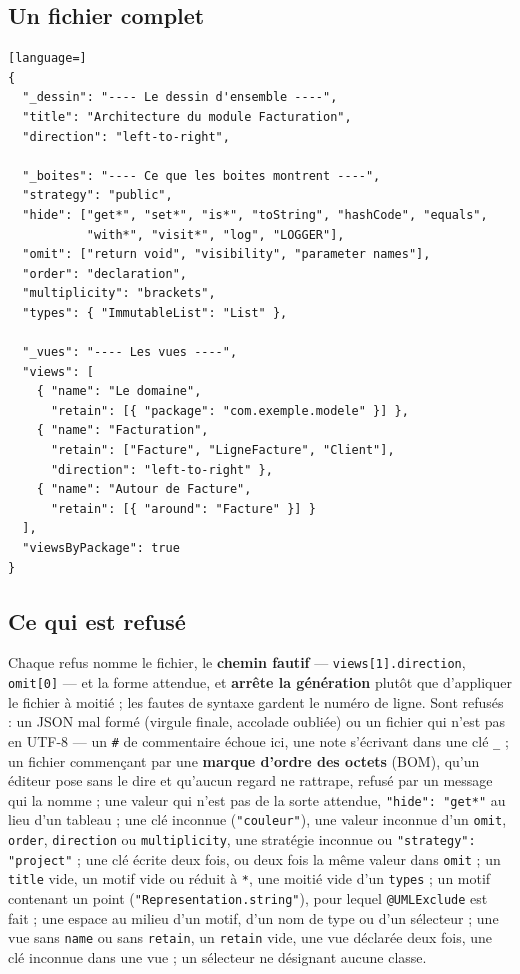 \documentclass[12pt, a4paper]{article}
\begin{document}
\subsection{Un fichier complet}
\begin{lstlisting}[language=]
{
  "_dessin": "---- Le dessin d'ensemble ----",
  "title": "Architecture du module Facturation",
  "direction": "left-to-right",

  "_boites": "---- Ce que les boites montrent ----",
  "strategy": "public",
  "hide": ["get*", "set*", "is*", "toString", "hashCode", "equals",
           "with*", "visit*", "log", "LOGGER"],
  "omit": ["return void", "visibility", "parameter names"],
  "order": "declaration",
  "multiplicity": "brackets",
  "types": { "ImmutableList": "List" },

  "_vues": "---- Les vues ----",
  "views": [
    { "name": "Le domaine",
      "retain": [{ "package": "com.exemple.modele" }] },
    { "name": "Facturation",
      "retain": ["Facture", "LigneFacture", "Client"],
      "direction": "left-to-right" },
    { "name": "Autour de Facture",
      "retain": [{ "around": "Facture" }] }
  ],
  "viewsByPackage": true
}
\end{lstlisting}

\subsection{Ce qui est refusé}
Chaque refus nomme le fichier, le \textbf{chemin fautif} --- \texttt{views[1].direction}, \texttt{omit[0]} --- et la forme attendue, et \textbf{arrête la génération} plutôt que d'appliquer le fichier à moitié ; les fautes de syntaxe gardent le numéro de ligne. Sont refusés : un JSON mal formé (virgule finale, accolade oubliée) ou un fichier qui n'est pas en UTF-8 --- un \texttt{\#} de commentaire échoue ici, une note s'écrivant dans une clé \texttt{\_} ; un fichier commençant par une \textbf{marque d'ordre des octets} (BOM), qu'un éditeur pose sans le dire et qu'aucun regard ne rattrape, refusé par un message qui la nomme ; une valeur qui n'est pas de la sorte attendue, \texttt{"hide": "get*"} au lieu d'un tableau ; une clé inconnue (\texttt{"couleur"}), une valeur inconnue d'un \texttt{omit}, \texttt{order}, \texttt{direction} ou \texttt{multiplicity}, une stratégie inconnue ou \texttt{"strategy": "project"} ; une clé écrite deux fois, ou deux fois la même valeur dans \texttt{omit} ; un \texttt{title} vide, un motif vide ou réduit à \texttt{*}, une moitié vide d'un \texttt{types} ; un motif contenant un point (\texttt{"Representation.string"}), pour lequel \texttt{@UMLExclude} est fait ; une espace au milieu d'un motif, d'un nom de type ou d'un sélecteur ; une vue sans \texttt{name} ou sans \texttt{retain}, un \texttt{retain} vide, une vue déclarée deux fois, une clé inconnue dans une vue ; un sélecteur ne désignant aucune classe.
\end{document}
